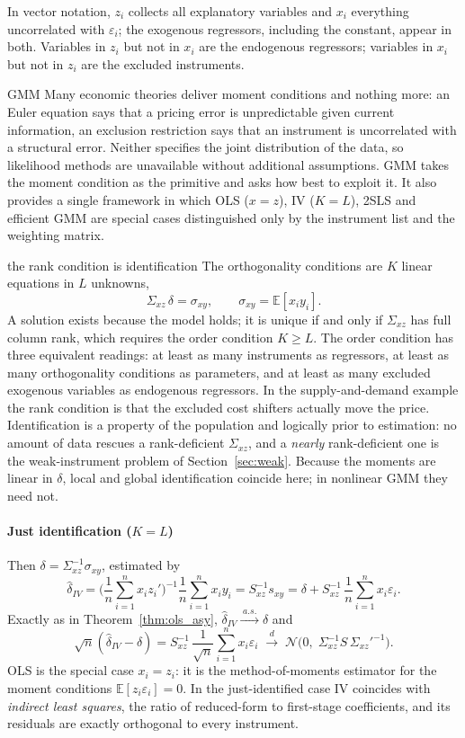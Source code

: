 \documentclass[11pt,a4paper]{article}
\newcommand{\E}{\mathbb{E}}
\newcommand{\N}{\mathcal{N}}
\newcommand{\cd}{\xrightarrow{\;d\;}}
\newcommand{\cas}{\xrightarrow{\;a.s.\;}}
\newcommand{\dhat}{\hat\delta}
\newcommand{\sxz}{\Sigma_{xz}}
\newcommand{\Sxz}{S_{xz}}
\begin{document}
In vector notation, $z_i$ collects all explanatory variables and $x_i$ everything uncorrelated with $\varepsilon_i$; the exogenous regressors, including the constant, appear in both. Variables in $z_i$ but not in $x_i$ are the endogenous regressors; variables in $x_i$ but not in $z_i$ are the excluded instruments.

\begin{whybox}{GMM}
Many economic theories deliver moment conditions and nothing more: an Euler equation says that a pricing error is unpredictable given current information, an exclusion restriction says that an instrument is uncorrelated with a structural error. Neither specifies the joint distribution of the data, so likelihood methods are unavailable without additional assumptions. GMM takes the moment condition as the primitive and asks how best to exploit it. It also provides a single framework in which OLS ($x=z$), IV ($K=L$), 2SLS and efficient GMM are special cases distinguished only by the instrument list and the weighting matrix.
\end{whybox}

\begin{whybox}{the rank condition is identification}
The orthogonality conditions are $K$ linear equations in $L$ unknowns,
\[
\sxz\,\delta=\sigma_{xy},\qquad\sigma_{xy}=\E[x_iy_i].
\]
A solution exists because the model holds; it is unique if and only if $\sxz$ has full column rank, which requires the order condition $K\geq L$. The order condition has three equivalent readings: at least as many instruments as regressors, at least as many orthogonality conditions as parameters, and at least as many excluded exogenous variables as endogenous regressors. In the supply-and-demand example the rank condition is that the excluded cost shifters actually move the price. Identification is a property of the population and logically prior to estimation: no amount of data rescues a rank-deficient $\sxz$, and a \emph{nearly} rank-deficient one is the weak-instrument problem of Section~\ref{sec:weak}. Because the moments are linear in $\delta$, local and global identification coincide here; in nonlinear GMM they need not.
\end{whybox}

\paragraph{Just identification ($K=L$)}
Then $\delta=\sxz^{-1}\sigma_{xy}$, estimated by
\[
\dhat_{IV}=\Big(\frac1n\sum_{i=1}^nx_iz_i'\Big)^{-1}\frac1n\sum_{i=1}^nx_iy_i=\Sxz^{-1}s_{xy}=\delta+\Sxz^{-1}\,\frac1n\sum_{i=1}^nx_i\varepsilon_i .
\]
Exactly as in Theorem~\ref{thm:ols_asy}, $\dhat_{IV}\cas\delta$ and
\[
\sqrt n(\dhat_{IV}-\delta)=\Sxz^{-1}\,\frac1{\sqrt n}\sum_{i=1}^nx_i\varepsilon_i\;\cd\;\N\big(0,\;\sxz^{-1}S\,\sxz'^{-1}\big).
\]
OLS is the special case $x_i=z_i$: it is the method-of-moments estimator for the moment conditions $\E[z_i\varepsilon_i]=0$. In the just-identified case IV coincides with \emph{indirect least squares}, the ratio of reduced-form to first-stage coefficients, and its residuals are exactly orthogonal to every instrument.
\end{document}
